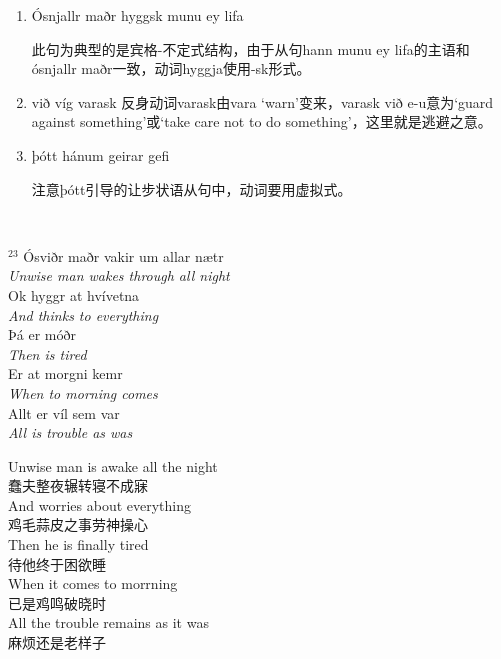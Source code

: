 \begin{grammar*}{}
    \begin{enumerate}[leftmargin=*]

        \item Ósnjallr maðr hyggsk munu ey lifa

              此句为典型的是宾格-不定式结构，由于从句hann munu ey lifa的主语和ósnjallr maðr一致，动词hyggja使用-sk形式。

        \item við víg varask
              反身动词varask由vara `warn'变来，varask við e-u意为`guard against something'或`take care not to do something'，这里就是逃避之意。

        \item þótt hánum geirar gefi

              注意þótt引导的让步状语从句中，动词要用虚拟式。

    \end{enumerate}
\end{grammar*}
\hspace*{\fill}\\ %
\begin{paracol}{2}
    \noindent
    $^{23}$ Ósviðr maðr vakir um allar nætr\\
    \textit{Unwise man wakes through all night}\\
    Ok hyggr at hvívetna\\
    \textit{And thinks to everything}\\
    \MakeUppercase þá er móðr\\
    \textit{Then is tired}\\
    Er at morgni kemr\\
    \textit{When to morning comes}\\
    Allt er víl sem var\\
    \textit{All is trouble as was}\\
    \switchcolumn

    \noindent
    Unwise man is awake all the night\\
    蠢夫整夜辗转寝不成寐\\
    And worries about everything\\
    鸡毛蒜皮之事劳神操心\\
    Then he is finally tired\\
    待他终于困欲睡\\
    When it comes to morrning\\
    已是鸡鸣破晓时\\
    All the trouble remains as it was \\
    麻烦还是老样子\\

\end{paracol}

